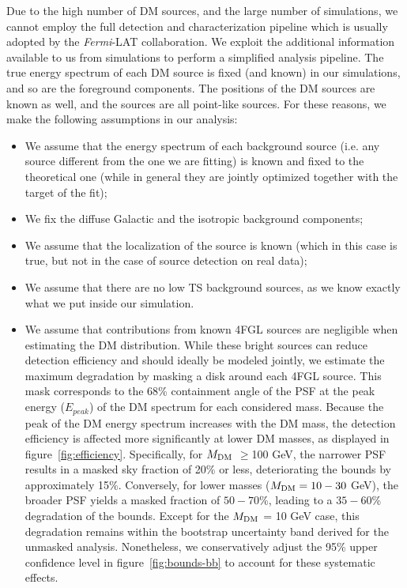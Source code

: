 \documentclass[12pt, a4paper]{article}
\newcommand{\Fermi}{{\sl Fermi}}
\newcommand{\mdm}{{M_{\rm DM}}}
\begin{document}
Due to the high number of DM sources, and the large number of simulations, we cannot employ the full detection and characterization pipeline which is usually adopted by the \Fermi-LAT collaboration.
We exploit the additional information available to us from simulations to perform a simplified analysis pipeline. 
The true energy spectrum of each DM source is fixed (and known) in our simulations, and so are the foreground components. The positions of the DM sources are known as well, and the sources are all point-like sources. For these reasons, we make the following assumptions in our analysis:
\begin{itemize}
    \item We assume that the energy spectrum of each background source (i.e. any source different from the one we are fitting) is known and fixed to the theoretical one (while in general they are jointly optimized together with the target of the fit);
    \item We fix the diffuse Galactic and the isotropic background components;
    \item We assume that the localization of the source is known (which in this case is true, but not in the case of source detection on real data);
    \item We assume that there are no low TS background sources, as we know exactly what we put inside our simulation.
    \item {We assume that contributions from known 4FGL sources are negligible when estimating the DM distribution. While these bright sources can reduce detection efficiency and should ideally be modeled jointly, we estimate the maximum degradation by masking a disk around each 4FGL source. 
    This mask corresponds to the 68\% containment angle of the PSF at the peak energy ($E_{peak}$) of the DM spectrum for each considered mass. Because the peak of the DM energy spectrum increases with the DM mass, the detection efficiency is affected more significantly at lower DM masses, as displayed in figure~\ref{fig:efficiency}. Specifically, for $\mdm$ $\geq$100 GeV, the narrower PSF results in a masked sky fraction of 20\% or less, deteriorating the bounds by approximately 15\%. 
    Conversely, for lower masses ($\mdm = 10 - 30$ GeV), the broader PSF yields a masked fraction of $50 - 70$\%, leading to a $35 - 60$\% degradation of the bounds. 
    Except for the $\mdm$ = 10 GeV case, this degradation remains within the bootstrap uncertainty band derived for the unmasked analysis. Nonetheless, we conservatively adjust the 95\% upper confidence level in figure~\ref{fig:bounds-bb} to account for these systematic effects.}
\end{itemize}
\end{document}

